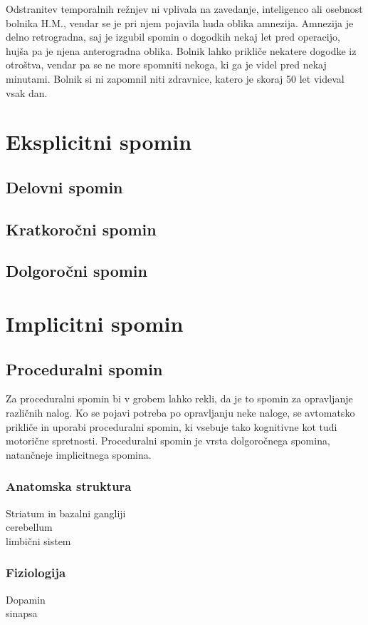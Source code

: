 \documentclass[10pt,a4paper]{article}
\begin{document}
Odstranitev temporalnih režnjev ni vplivala na zavedanje, inteligenco ali osebnost bolnika H.M., vendar se je pri njem pojavila huda oblika amnezija. Amnezija je delno retrogradna, saj je izgubil spomin o dogodkih nekaj let pred operacijo, hujša pa je njena anterogradna oblika. Bolnik lahko prikliče nekatere dogodke iz otroštva, vendar pa se ne more spomniti nekoga, ki ga je videl pred nekaj minutami. Bolnik si ni zapomnil niti zdravnice, katero je skoraj 50 let videval vsak dan. 


\section{Eksplicitni spomin}
\subsection{Delovni spomin}

\subsection{Kratkoročni spomin}

\subsection{Dolgoročni spomin}

\section{Implicitni spomin}
\subsection{Proceduralni spomin}
Za proceduralni spomin bi v grobem lahko rekli, da je to spomin za opravljanje različnih nalog. Ko se pojavi potreba po opravljanju neke naloge, se avtomatsko prikliče in uporabi proceduralni spomin, ki vsebuje tako kognitivne kot tudi motorične spretnosti. Proceduralni spomin je vrsta dolgoročnega spomina, natančneje implicitnega spomina.

\subsubsection{Anatomska struktura}
Striatum in bazalni gangliji\\
cerebellum\\
limbični sistem

\subsubsection{Fiziologija}
Dopamin\\
sinapsa
\end{document}
